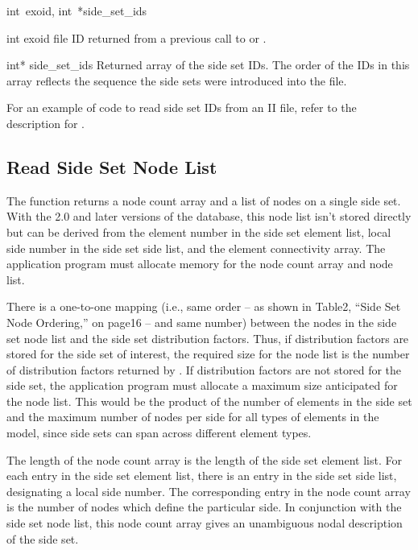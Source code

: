 {int~exoid, 
int~*side_set_ids}

\begin{parameters}
\item[{int exoid \R{}}]
\exo{} file ID returned from a previous call to  or
.

\item[{int* side_set_ids \W{}}]
Returned array of the side set IDs. The order of the IDs in this array
reflects the sequence the side sets were introduced into the file.
\end{parameters}

For an example of code to read side set IDs from an \exo{} II file,
refer to the description for .

\subsection{Read Side Set Node List}

The function  returns a node
count array and a list of nodes on a single side set. With the 2.0 and
later versions of the database, this node list isn't stored directly
but can be derived from the element number in the side set element
list, local side number in the side set side list, and the element
connectivity array. The application program must allocate memory for
the node count array and node list.

There is a one-to-one mapping (i.e., same order -- as shown in
Table{\nobreakspace}2, ``Side Set Node Ordering,'' on
page{\nobreakspace}16 -- and same number) between the nodes in the
side set node list and the side set distribution factors. Thus, if
distribution factors are stored for the side set of interest, the
required size for the node list is the number of distribution factors
returned by . If distribution factors
are not stored for the side set, the application program must allocate
a maximum size anticipated for the node list. This would be the
product of the number of elements in the side set and the maximum
number of nodes per side for all types of elements in the model, since
side sets can span across different element types.

The length of the node count array is the length of the side set
element list. For each entry in the side set element list, there is an
entry in the side set side list, designating a local side number. The
corresponding entry in the node count array is the number of nodes
which define the particular side. In conjunction with the side set
node list, this node count array gives an unambiguous nodal
description of the side set.

